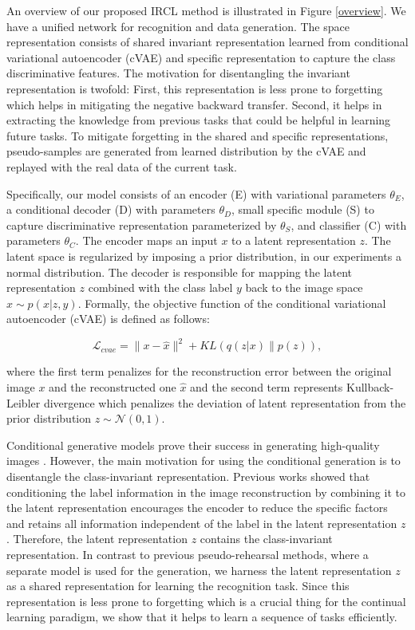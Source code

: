 \documentclass[letterpaper]{article} %
\begin{document}
An overview of our proposed IRCL method is illustrated in Figure \ref{overview}. We have a unified network for recognition and data generation. The space representation consists of shared invariant representation learned from conditional variational autoencoder (cVAE) and specific representation to capture the class discriminative features. The motivation for disentangling the invariant representation is twofold: First, this representation is less prone to forgetting which helps in mitigating the negative backward transfer. Second, it helps in extracting the knowledge from previous tasks that could be helpful in learning future tasks. To mitigate forgetting in the shared and specific representations, pseudo-samples are generated from learned distribution by the cVAE and replayed with the real data of the current task. 

Specifically, our model consists of an encoder (E) with variational parameters $\theta_{E}$, a conditional decoder (D) with parameters $\theta_{D}$, small specific module (S) to capture discriminative representation parameterized by $\theta_{S}$, and classifier (C) with parameters $\theta_{C}$. The encoder maps an input $x$ to a latent representation $z$. The latent space is regularized by imposing a prior distribution, in our experiments a normal
distribution. The decoder is responsible for mapping the latent representation $z$ combined with the class label $y$ back to the image space $\hat{x} \sim p(x|z,y)$. Formally, the objective function of the conditional variational autoencoder (cVAE) is defined as follows:

\begin{equation}
 \mathcal{L}_{cvae} = \|x- \hat{x}\|^{2} + KL(q(z|x)\|p(z)),
\label{vaeLoss}
\end{equation}

where the first term penalizes for the reconstruction error between the original image $x$ and the reconstructed one $\hat{x}$ and the second term represents Kullback-Leibler divergence which penalizes the deviation of latent representation from the prior distribution  $z \sim \mathcal{N}(0,1)$.

Conditional generative models prove their success in generating high-quality images \cite{miyato2018cgans,odena2017conditional}. However, the main motivation for using the conditional generation is to disentangle the class-invariant representation. Previous works \cite{makhzani2015adversarial,chen2020cyclically} showed that conditioning the label information in the image reconstruction by combining it to the latent representation encourages the encoder to reduce the specific factors and retains all information independent of the label in the latent representation $z$. Therefore, the latent representation $z$ contains the class-invariant representation. In contrast to previous pseudo-rehearsal methods, where a separate model is used for the generation, we harness the latent representation $z$ as a shared representation for learning the recognition task. Since this representation is less prone to forgetting which is a crucial thing for the continual learning paradigm, we show that it helps to learn a sequence of tasks efficiently. 
\end{document}
